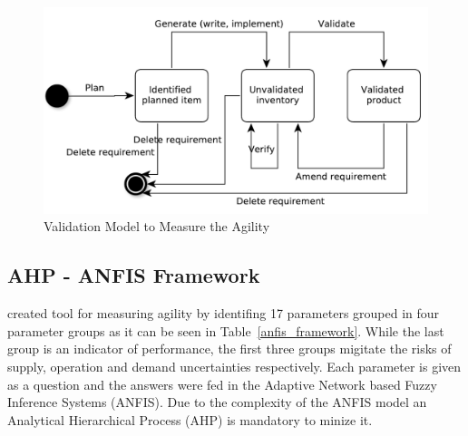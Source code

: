 \begin{figure} [H]
\centerline{\includegraphics[scale=0.6]{include/relatedwork/fig/validation_model.pdf}}
\caption{Validation Model to Measure the Agility} 
\label{validation_model}
\end{figure}

\subsection{AHP - ANFIS Framework} %
\citet{poonacha} created tool for measuring agility by identifing 17 parameters grouped in four parameter groups as it can be seen in Table~\ref{anfis_framework}. While the last group is an indicator of performance, the first three groups migitate the risks of supply, operation and demand uncertainties respectively. Each parameter is given as a question and the answers were fed in the Adaptive Network based Fuzzy Inference Systems (ANFIS). Due to the complexity of the ANFIS model an Analytical Hierarchical Process (AHP) is mandatory to minize it.

